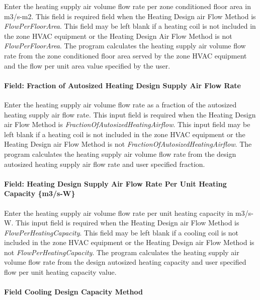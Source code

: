 Enter the heating supply air volume flow rate per zone conditioned floor area in m3/s-m2. This field is required field when the Heating Design air Flow Method is \emph{FlowPerFloorArea}. This field may be left blank if a heating coil is not included in the zone HVAC equipment or the Heating Design Air Flow Method is not \emph{FlowPerFloorArea}. The program calculates the heating supply air volume flow rate from the zone conditioned floor area served by the zone HVAC equipment and the flow per unit area value specified by the user.

\paragraph{Field: Fraction of Autosized Heating Design Supply Air Flow Rate}\label{field-fraction-of-autosized-heating-design-supply-air-flow-rate}

Enter the heating supply air volume flow rate as a fraction of the autosized heating supply air flow rate. This input field is required when the Heating Design air Flow Method is \emph{FractionOfAutosizedHeatingAirflow}. This input field may be left blank if a heating coil is not included in the zone HVAC equipment or the Heating Design air Flow Method is not \emph{FractionOfAutosizedHeatingAirflow}. The program calculates the heating supply air volume flow rate from the design autosized heating supply air flow rate and user specified fraction.

\paragraph{Field: Heating Design Supply Air Flow Rate Per Unit Heating Capacity \{m3/s-W\}}\label{field-heating-design-supply-air-flow-rate-per-unit-heating-capacity-m3s-w}

Enter the heating supply air volume flow rate per unit heating capacity in m3/s-W. This input field is required when the Heating Design air Flow Method is \emph{FlowPerHeatingCapacity}. This field may be left blank if a cooling coil is not included in the zone HVAC equipment or the Heating Design air Flow Method is not \emph{FlowPerHeatingCapacity}. The program calculates the heating supply air volume flow rate from the design autosized heating capacity and user specified flow per unit heating capacity value.

\paragraph{Field Cooling Design Capacity Method}\label{field-cooling-design-capacity-method}

